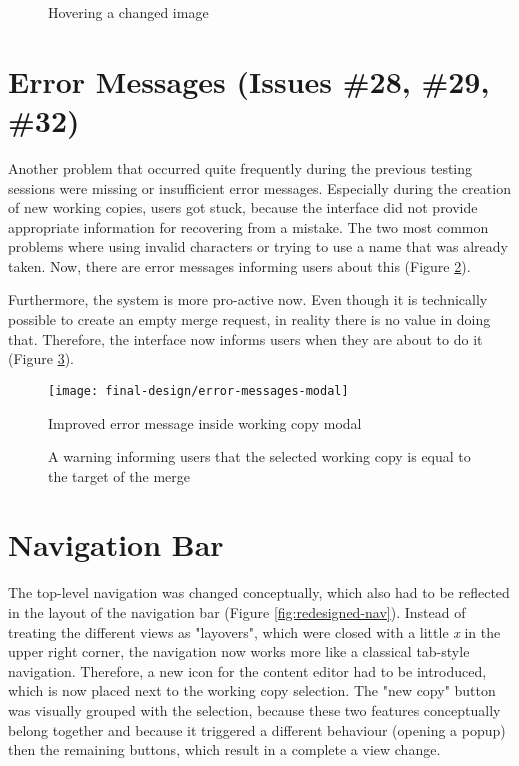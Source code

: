 \begin{figure}[h!]
 \centering
 \caption{Hovering a changed image}
 \label{fig:hover-changed-image}
\end{figure}


\section{Error Messages (Issues \#28, \#29, \#32)}
Another problem that occurred quite frequently during the previous testing sessions were missing or insufficient error messages. Especially during the creation of new working copies, users got stuck, because the interface did not provide appropriate information for recovering from a mistake. The two most common problems where using invalid characters or trying to use a name that was already taken. Now, there are error messages informing users about this (Figure \ref{fig:improv-error-messages}).

Furthermore, the system is more pro-active now. Even though it is technically possible to create an empty merge request, in reality there is no value in doing that. Therefore, the interface now informs users when they are about to do it (Figure \ref{fig:empty-merge-warning}).  

\begin{figure}[h!]
 \centering
 \texttt{[image: final-design/error-messages-modal]}
 \caption{Improved error message inside working copy modal}
 \label{fig:improv-error-messages}
\end{figure}

\begin{figure}[h!]
 \centering
 \caption{A warning informing users that the selected working copy is equal to the target of the merge}
 \label{fig:empty-merge-warning}
\end{figure}

\section{Navigation Bar}
The top-level navigation was changed conceptually, which also had to be reflected in the layout of the navigation bar (Figure \ref{fig:redesigned-nav}). Instead of treating the different views as "layovers", which were closed with a little \textit{x} in the upper right corner, the navigation now works more like a classical tab-style navigation. Therefore, a new icon for the content editor had to be introduced, which is now placed next to the working copy selection. The "new copy" button was visually grouped with the selection, because these two features conceptually belong together and because it triggered a different behaviour (opening a popup) then the remaining buttons, which result in a complete a view change. 

